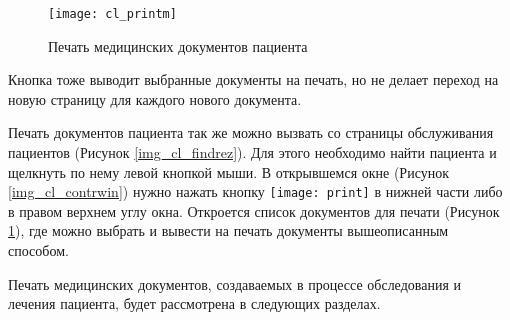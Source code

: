 \begin{figure}[ht]\centering
 \texttt{[image: cl\_printm]}
 \caption{Печать медицинских документов пациента}
 \label{img_cl_printm}
\end{figure} 

Кнопка  тоже выводит выбранные документы на печать, но не делает переход на новую страницу для каждого нового документа.

Печать документов пациента так же можно вызвать со страницы обслуживания пациентов (Рисунок \ref{img_cl_findrez}). Для этого необходимо найти пациента и щелкнуть по нему левой кнопкой мыши. В открывшемся окне (Рисунок \ref{img_cl_contrwin}) нужно нажать кнопку \texttt{[image: print]} в нижней части либо в правом верхнем углу окна. Откроется список документов для печати (Рисунок \ref{img_cl_printm}), где можно выбрать и вывести на печать документы вышеописанным способом. 
   
Печать медицинских документов, создаваемых в процессе обследования и лечения пациента, будет рассмотрена в следующих разделах.

